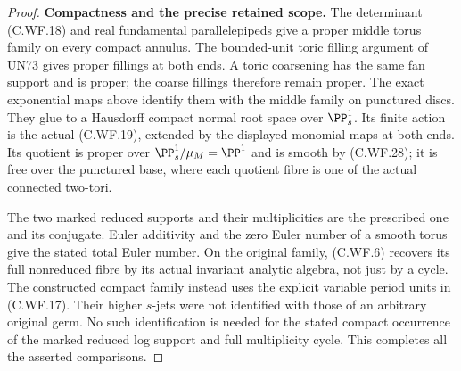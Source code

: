 \begin{proof}
\par\medskip\noindent\textbf{Compactness and the precise retained scope.}
The determinant (C.WF.18) and real fundamental
parallelepipeds give a proper middle torus family
on every compact annulus.  The bounded-unit
toric filling argument of UN73 gives proper
fillings at both ends.  A toric coarsening has
the same fan support and is proper; the coarse
fillings therefore remain proper.  The exact
exponential maps above identify them with the
middle family on punctured discs.  They glue
to a Hausdorff compact normal root space over
\(\PP^1_s\).  Its finite action is the actual
(C.WF.19), extended by the displayed monomial
maps at both ends.  Its quotient is proper
over \(\PP^1_s/\mu_M=\PP^1\) and is smooth
by (C.WF.28); it is free over the punctured
base, where each quotient fibre is one of
the actual connected two-tori.

The two marked reduced supports and their
multiplicities are the prescribed one and
its conjugate.  Euler additivity and the
zero Euler number of a smooth torus give
the stated total Euler number.  On the
original family, (C.WF.6) recovers its full
nonreduced fibre by its actual invariant
analytic algebra, not just by a cycle.
The constructed compact family instead
uses the explicit variable period units
in (C.WF.17).  Their higher \(s\)-jets were
not identified with those of an arbitrary
original germ.  No such identification is
needed for the stated compact occurrence
of the marked reduced log support and
full multiplicity cycle.  This completes
all the asserted comparisons.
\end{proof}
